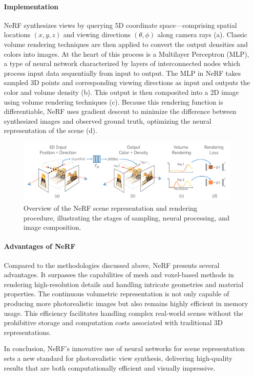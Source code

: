 \paragraph{Implementation}
NeRF synthesizes views by querying 5D coordinate space—comprising spatial locations \((x, y, z)\) and viewing directions \((\theta, \phi)\) along camera rays (a). Classic volume rendering techniques are then applied to convert the output densities and colors into images. At the heart of this process is a Multilayer Perceptron (MLP), a type of neural network characterized by layers of interconnected nodes which process input data sequentially from input to output. The MLP in NeRF takes sampled 3D points and corresponding viewing directions as input and outputs the color and volume density (b). This output is then composited into a 2D image using volume rendering techniques (c). Because this rendering function is differentiable, NeRF uses gradient descent to minimize the difference between synthesized images and observed ground truth, optimizing the neural representation of the scene (d). 

\begin{figure}[h!]
  \centering
  \includegraphics[width=\textwidth]{figures/bg-nerf.png}
  \caption{Overview of the NeRF scene representation and rendering procedure, illustrating the stages of sampling, neural processing, and image composition.}
  \label{fig:nerf-overview}
\end{figure}

\paragraph{Advantages of NeRF}
Compared to the methodologies discussed above, NeRF presents several advantages. It surpasses the capabilities of mesh and voxel-based methods in rendering high-resolution details and handling intricate geometries and material properties. The continuous volumetric representation is not only capable of producing more photorealistic images but also remains highly efficient in memory usage. This efficiency facilitates handling complex real-world scenes without the prohibitive storage and computation costs associated with traditional 3D representations.

In conclusion, NeRF's innovative use of neural networks for scene representation sets a new standard for photorealistic view synthesis, delivering high-quality results that are both computationally efficient and visually impressive.
